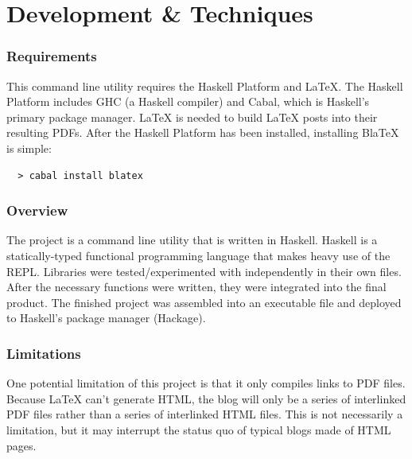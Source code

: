 \documentclass[doc,apacite,12pt]{apa6}
\begin{document}
\section{Development \& Techniques}

\subsubsection{Requirements}
  This command line utility requires the Haskell Platform and LaTeX. The Haskell Platform includes GHC (a Haskell compiler) and Cabal, which is Haskell's primary package manager. LaTeX is needed to build LaTeX posts into their resulting PDFs. After the Haskell Platform has been installed, installing BlaTeX is simple:

  \begin{lstlisting}
  > cabal install blatex
  \end{lstlisting}

\subsubsection{Overview}
  The project is a command line utility that is written in Haskell. Haskell is a statically-typed functional programming language that makes heavy use of the REPL. Libraries were tested/experimented with independently in their own files. After the necessary functions were written, they were integrated into the final product. The finished project was assembled into an executable file and deployed to Haskell's package manager (Hackage). 

\subsubsection{Limitations}

  One potential limitation of this project is that it only compiles links to PDF files. Because LaTeX can't generate HTML, the blog will only be a series of interlinked PDF files rather than a series of interlinked HTML files. This is not necessarily a limitation, but it may interrupt the status quo of typical blogs made of HTML pages. 
\end{document}
